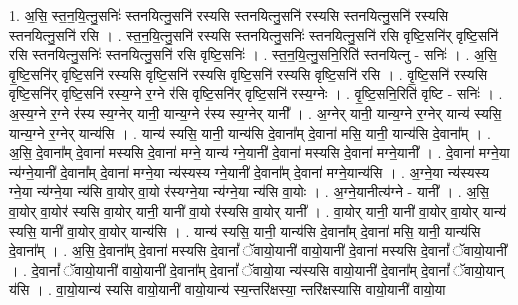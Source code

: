 \documentclass[17pt]{extarticle}
\begin{document}
1. अ॒सि॒ स्त॒न॒यि॒त्नु॒सनिः॑ स्तनयित्नु॒सनि॑ रस्यसि स्तनयित्नु॒सनि॑ रस्यसि स्तनयित्नु॒सनि॑ रस्यसि स्तनयित्नु॒सनि॑ रसि । . स्त॒न॒यि॒त्नु॒सनि॑ रस्यसि स्तनयित्नु॒सनिः॑ स्तनयित्नु॒सनि॑ रसि वृष्टि॒सनि॑र् वृष्टि॒सनि॑ रसि स्तनयित्नु॒सनिः॑ स्तनयित्नु॒सनि॑ रसि वृष्टि॒सनिः॑ । . स्त॒न॒यि॒त्नु॒सनि॒रिति॑ स्तनयित्नु - सनिः॑ । . अ॒सि॒ वृ॒ष्टि॒सनि॑र् वृष्टि॒सनि॑ रस्यसि वृष्टि॒सनि॑ रस्यसि वृष्टि॒सनि॑ रस्यसि वृष्टि॒सनि॑ रसि । . वृ॒ष्टि॒सनि॑ रस्यसि वृष्टि॒सनि॑र् वृष्टि॒सनि॑ रस्य॒ग्ने र॒ग्ने र॑सि वृष्टि॒सनि॑र् वृष्टि॒सनि॑ रस्य॒ग्नेः । . वृ॒ष्टि॒सनि॒रिति॑ वृष्टि - सनिः॑ । . अ॒स्य॒ग्ने र॒ग्ने र॑स्य स्य॒ग्नेर् यानी॒ यान्य॒ग्ने र॑स्य स्य॒ग्नेर् यानी᳚ । . अ॒ग्नेर् यानी॒ यान्य॒ग्ने र॒ग्नेर् यान्य॑ स्यसि॒ यान्य॒ग्ने र॒ग्नेर् यान्य॑सि । . यान्य॑ स्यसि॒ यानी॒ यान्य॑सि दे॒वाना᳚म् दे॒वाना॑ मसि॒ यानी॒ यान्य॑सि दे॒वाना᳚म् । . अ॒सि॒ दे॒वाना᳚म् दे॒वाना॑ मस्यसि दे॒वाना॑ मग्ने॒ यान्य॑ ग्ने॒यानी॑ दे॒वाना॑ मस्यसि दे॒वाना॑ मग्ने॒यानी᳚ । . दे॒वाना॑ मग्ने॒या न्य॑ग्ने॒यानी॑ दे॒वाना᳚म् दे॒वाना॑ मग्ने॒या न्य॑स्यस्य ग्ने॒यानी॑ दे॒वाना᳚म् दे॒वाना॑ मग्ने॒यान्य॑सि । . अ॒ग्ने॒या न्य॑स्यस्य ग्ने॒या न्य॑ग्ने॒या न्य॑सि वा॒योर् वा॒यो र॑स्यग्ने॒या न्य॑ग्ने॒या न्य॑सि वा॒योः । . अ॒ग्ने॒यानीत्य॑ग्ने - यानी᳚ । . अ॒सि॒ वा॒योर् वा॒योर॑ स्यसि वा॒योर् यानी॒ यानी॑ वा॒यो र॑स्यसि वा॒योर् यानी᳚ । . वा॒योर् यानी॒ यानी॑ वा॒योर् वा॒योर् यान्य॑ स्यसि॒ यानी॑ वा॒योर् वा॒योर् यान्य॑सि । . यान्य॑ स्यसि॒ यानी॒ यान्य॑सि दे॒वाना᳚म् दे॒वाना॑ मसि॒ यानी॒ यान्य॑सि दे॒वाना᳚म् । . अ॒सि॒ दे॒वाना᳚म् दे॒वाना॑ मस्यसि दे॒वानां᳚ ॅवायो॒यानी॑ वायो॒यानी॑ दे॒वाना॑ मस्यसि दे॒वानां᳚ ॅवायो॒यानी᳚ । . दे॒वानां᳚ ॅवायो॒यानी॑ वायो॒यानी॑ दे॒वाना᳚म् दे॒वानां᳚ ॅवायो॒या न्य॑स्यसि वायो॒यानी॑ दे॒वाना᳚म् दे॒वानां᳚ ॅवायो॒यान् य॑सि । . वा॒यो॒यान्य॑ स्यसि वायो॒यानी॑ वायो॒यान्य॑ स्य॒न्तरि॑क्षस्या॒ न्तरि॑क्षस्यासि वायो॒यानी॑ वायो॒या
\end{document}
